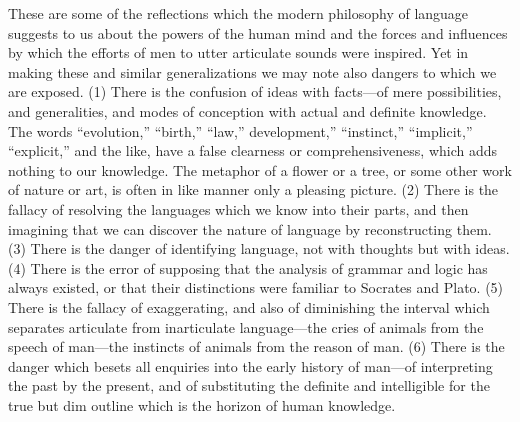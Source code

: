 \documentclass[11pt,letter]{article}
\begin{document}
\par  These are some of the reflections which the modern philosophy of language suggests to us about the powers of the human mind and the forces and influences by which the efforts of men to utter articulate sounds were inspired. Yet in making these and similar generalizations we may note also dangers to which we are exposed. (1) There is the confusion of ideas with facts—of mere possibilities, and generalities, and modes of conception with actual and definite knowledge. The words “evolution,” “birth,” “law,” development,” “instinct,” “implicit,” “explicit,” and the like, have a false clearness or comprehensiveness, which adds nothing to our knowledge. The metaphor of a flower or a tree, or some other work of nature or art, is often in like manner only a pleasing picture. (2) There is the fallacy of resolving the languages which we know into their parts, and then imagining that we can discover the nature of language by reconstructing them. (3) There is the danger of identifying language, not with thoughts but with ideas. (4) There is the error of supposing that the analysis of grammar and logic has always existed, or that their distinctions were familiar to Socrates and Plato. (5) There is the fallacy of exaggerating, and also of diminishing the interval which separates articulate from inarticulate language—the cries of animals from the speech of man—the instincts of animals from the reason of man. (6) There is the danger which besets all enquiries into the early history of man—of interpreting the past by the present, and of substituting the definite and intelligible for the true but dim outline which is the horizon of human knowledge.
\end{document}
